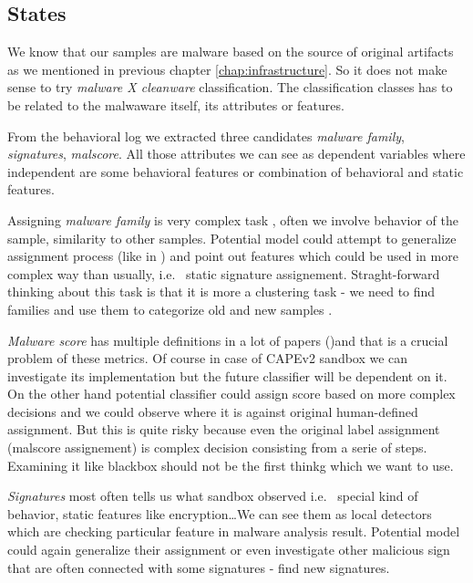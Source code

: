 \subsection{States}
We know that our samples are malware based on the source of original artifacts as we mentioned in previous chapter \ref{chap:infrastructure}. So it does not make sense to try \emph{malware X cleanware} classification. The classification classes has to be related to the malwaware itself, its attributes or features.

From the behavioral log we extracted three candidates \emph{malware family}, \emph{signatures}, \emph{malscore}. All those attributes we can see as dependent variables where independent are some behavioral features or combination of behavioral and static features. 

Assigning \emph{malware family} is very complex task \cite{Gennari2011}, often we involve behavior of the sample, similarity to other samples. Potential model could attempt to generalize assignment process (like in \cite{Rieck2008}) and point out features which could be used in more complex way than usually, i.e. \ static signature assignement. Straght-forward thinking about this task is that it is more a clustering task - we need to find families and use them to categorize old and new samples \cite{Pitolli2017}.


\emph{Malware score} has multiple definitions in a lot of papers (\cite{Walker2019, Kumar2014})and that is a crucial problem of these metrics. Of course in case of CAPEv2 sandbox we can investigate its implementation but the future classifier will be dependent on it. On the other hand potential classifier could assign score based on more complex decisions and we could observe where it is against original human-defined assignment. But this is quite risky because even the original label assignment (malscore assignement) is complex decision consisting from a serie of steps. Examining it like blackbox should not be the first thinkg which we want to use.

\emph{Signatures} most often tells us what sandbox observed i.e. \ special kind of behavior, static features like encryption\dots We can see them as local detectors which are checking particular feature in malware analysis result. Potential model could again generalize their assignment or even investigate other malicious sign that are often connected with some signatures - find new signatures.

